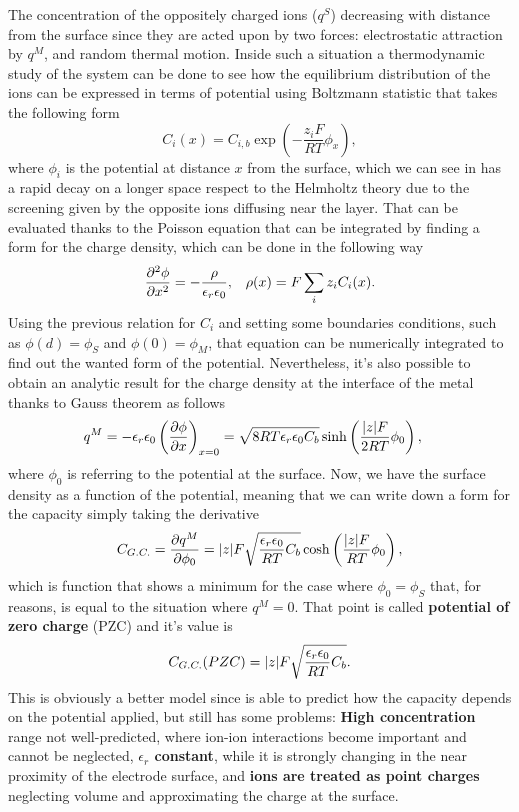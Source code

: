 The concentration of the oppositely charged ions ($q^S$) decreasing with distance from the surface since they are acted upon by two forces: electrostatic attraction by $q^M$, and random thermal motion. Inside such a situation a thermodynamic study of the system can be done to see how the equilibrium distribution of the ions can be expressed in terms of potential using Boltzmann statistic that takes the following form
\begin{equation}
    C_i(x) = C_{i,b}\exp\left( -\frac{z_iF}{RT}\phi_x \right),
\end{equation}
where $\phi_i$ is the potential at distance $x$ from the surface, which we can see in  has a rapid decay on a longer space respect to the Helmholtz theory due to the screening given by the opposite ions diffusing near the layer. That can be evaluated thanks to the Poisson equation that can be integrated by finding a form for the charge density, which can be done in the following way
\begin{align}
    &\pdv[2]{\phi}{x} = -\frac{\rho}{\epsilon_r\epsilon_0}, &\rho(x) = F\sum_i z_iC_i(x).
\end{align}
Using the previous relation for $C_i$ and setting some boundaries conditions, such as $\phi(d) = \phi_S$ and $\phi(0) = \phi_M$, that equation can be numerically integrated to find out the wanted form of the potential. Nevertheless, it's also possible to obtain an analytic result for the charge density at the interface of the metal thanks to Gauss theorem as follows
\begin{align}
    &q^M = -\epsilon_r\epsilon_0\left( \pdv{\phi}{x} \right)_{x=0} = \sqrt{8RT\epsilon_r\epsilon_0 C_b}\sinh\left( \frac{\abs{z}F}{2RT} \phi_0\right),
\end{align}
where $\phi_0$ is referring to the potential at the surface. Now, we have the surface density as a function of the potential, meaning that we can write down a form for the capacity simply taking the derivative
\begin{equation}
    C_{G.C.} = \pdv{q^M}{\phi_0} = \abs{z}F\sqrt{\frac{\epsilon_r\epsilon_0}{RT}C_b}\cosh\left( \frac{\abs{z}F}{RT} \phi_0 \right),
\end{equation}
which is function that shows a minimum for the case where $\phi_0 = \phi_S$ that, for reasons, is equal to the situation where $q^M = 0$. That point is called \textbf{potential of zero charge} (PZC) and it's value is
\begin{equation}
    C_{G.C.}(PZC) = \abs{z}F\sqrt{\frac{\epsilon_r\epsilon_0}{RT}C_b}.
\end{equation}
This is obviously a better model since is able to predict how the capacity depends on the potential applied, but still has some problems: \textbf{High concentration} range not well-predicted, where ion-ion interactions become important and cannot be neglected, \textbf{$\epsilon_r$ constant}, while it is strongly changing in the near proximity of the electrode surface, and \textbf{ions are treated as point charges} neglecting volume and approximating the charge at the surface. 

